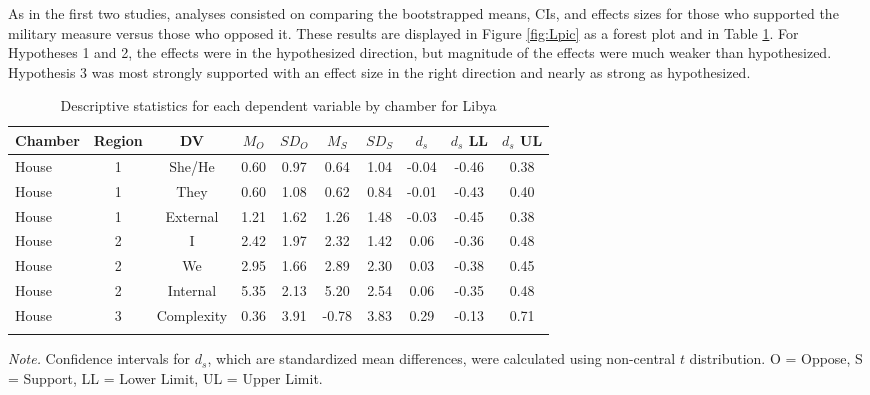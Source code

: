 \documentclass[english,,man]{apa6}
\begin{document}
As in the first two studies, analyses consisted on comparing the bootstrapped means, CIs, and effects sizes for those who supported the military measure versus those who opposed it. These results are displayed in Figure \ref{fig:Lpic} as a forest plot and in Table \ref{tab:Ltable}. For Hypotheses 1 and 2, the effects were in the hypothesized direction, but magnitude of the effects were much weaker than hypothesized. Hypothesis 3 was most strongly supported with an effect size in the right direction and nearly as strong as hypothesized.

\begin{table}[tbp]

\begin{center}
\begin{threeparttable}

\caption{\label{tab:Ltable}Descriptive statistics for each dependent variable by chamber for Libya}

\small{

\begin{tabular}{lccccccccc}
\toprule
Chamber & Region & DV & $M_O$ & $SD_O$ & $M_S$ & $SD_S$ & $d_s$ & $d_s$ LL & $d_s$ UL\\
\midrule
House & 1 & She/He & 0.60 & 0.97 & 0.64 & 1.04 & -0.04 & -0.46 & 0.38\\
House & 1 & They & 0.60 & 1.08 & 0.62 & 0.84 & -0.01 & -0.43 & 0.40\\
House & 1 & External & 1.21 & 1.62 & 1.26 & 1.48 & -0.03 & -0.45 & 0.38\\
House & 2 & I & 2.42 & 1.97 & 2.32 & 1.42 & 0.06 & -0.36 & 0.48\\
House & 2 & We & 2.95 & 1.66 & 2.89 & 2.30 & 0.03 & -0.38 & 0.45\\
House & 2 & Internal & 5.35 & 2.13 & 5.20 & 2.54 & 0.06 & -0.35 & 0.48\\
House & 3 & Complexity & 0.36 & 3.91 & -0.78 & 3.83 & 0.29 & -0.13 & 0.71\\
\bottomrule
\addlinespace
\end{tabular}

}

\begin{tablenotes}[para]
\normalsize{\textit{Note.} Confidence intervals for $d_s$, which are standardized mean differences, were calculated using 
          non-central $t$ distribution. O = Oppose, S = Support, LL = Lower Limit, UL = Upper Limit.}
\end{tablenotes}

\end{threeparttable}
\end{center}

\end{table}
\end{document}

